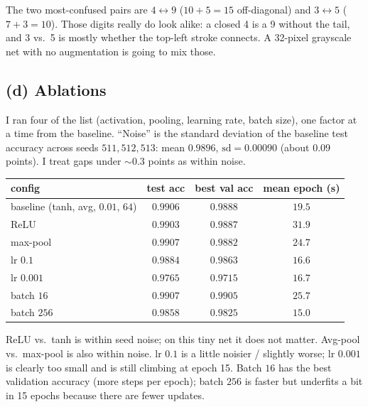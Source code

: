 \documentclass[11pt]{article}
\begin{document}
The two most-confused pairs are \(4\leftrightarrow 9\) (\(10+5=15\)
off-diagonal) and \(3\leftrightarrow 5\) (\(7+3=10\)). Those digits really
do look alike: a closed 4 is a 9 without the tail, and 3 vs.\ 5 is mostly
whether the top-left stroke connects. A 32-pixel grayscale net with no
augmentation is going to mix those.

\subsection*{(d) Ablations}

I ran four of the list (activation, pooling, learning rate, batch size),
one factor at a time from the baseline. ``Noise'' is the standard
deviation of the baseline test accuracy across seeds \(511,512,513\):
mean \(0.9896\), \(\mathrm{sd}=0.00090\) (about \(0.09\) points). I treat
gaps under \(\sim 0.3\) points as within noise.

\begin{center}
\footnotesize
\begin{tabular}{lccc}
    \toprule
    config & test acc & best val acc & mean epoch (s) \\
    \midrule
    baseline (tanh, avg, \(0.01\), \(64\)) & \(0.9906\) & \(0.9888\) & \(19.5\) \\
    ReLU & \(0.9903\) & \(0.9887\) & \(31.9\) \\
    max-pool & \(0.9907\) & \(0.9882\) & \(24.7\) \\
    lr \(0.1\) & \(0.9884\) & \(0.9863\) & \(16.6\) \\
    lr \(0.001\) & \(0.9765\) & \(0.9715\) & \(16.7\) \\
    batch \(16\) & \(0.9907\) & \(0.9905\) & \(25.7\) \\
    batch \(256\) & \(0.9858\) & \(0.9825\) & \(15.0\) \\
    \bottomrule
\end{tabular}
\end{center}

ReLU vs.\ tanh is within seed noise; on this tiny net it does not matter.
Avg-pool vs.\ max-pool is also within noise. lr \(0.1\) is a little
noisier / slightly worse; lr \(0.001\) is clearly too small and is still
climbing at epoch 15. Batch \(16\) has the best validation accuracy
(more steps per epoch); batch \(256\) is faster but underfits a bit in
15 epochs because there are fewer updates.

\end{document}
